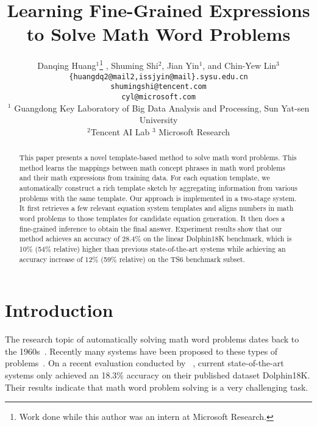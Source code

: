\documentclass[11pt,letterpaper]{article}
\title{Learning Fine-Grained Expressions to Solve Math Word Problems}
\author{Danqing Huang$^1$\thanks{Work done while this author was an intern at Microsoft Research.} , Shuming Shi$^2$, Jian Yin$^1$,
        and Chin-Yew Lin$^3$\\
       {\tt \{huangdq2@mail2,issjyin@mail\}.sysu.edu.cn}\\
       {\tt shumingshi@tencent.com}\\
       {\tt cyl@microsoft.com}\\
       $^1$ Guangdong Key Laboratory of Big Data Analysis and Processing, Sun Yat-sen University\\
       $^2$Tencent AI Lab $^3$ Microsoft Research\\
}
\date{}
\begin{document}
\maketitle

\begin{abstract}
    This paper presents a novel template-based method to solve math word problems. This method learns the mappings between math concept phrases in math word problems and their math expressions from training data. For each equation template, we automatically construct a rich template sketch by aggregating information from various problems with the same template. Our approach is implemented in a two-stage system. It first retrieves a few relevant equation system templates and aligns numbers in math word problems to those templates for candidate equation generation. It then does a fine-grained inference to obtain the final answer. Experiment results show that our method achieves an accuracy of 28.4\% on the linear Dolphin18K benchmark, which is 10\% (54\% relative) higher than previous state-of-the-art systems while achieving an accuracy increase of 12\% (59\% relative) on the TS6 benchmark subset.
\end{abstract}


\section{Introduction}

The research topic of automatically solving math word problems dates back to the 1960s~\cite{bobrow1964a,bobrow1964b,Charniak1968}. Recently many systems have been proposed to these types of problems~\cite{kushman2014mit,hosseini2014verb,rik2015alges,lipu2015baidu,subhro2015tree,shuming2015dolphin,upadhyay2016implicit,mitra2016}. On a recent evaluation conducted by ~, current state-of-the-art systems only achieved an 18.3\% accuracy on their published dataset Dolphin18K. Their results indicate that math word problem solving is a very challenging task.
\end{document}
